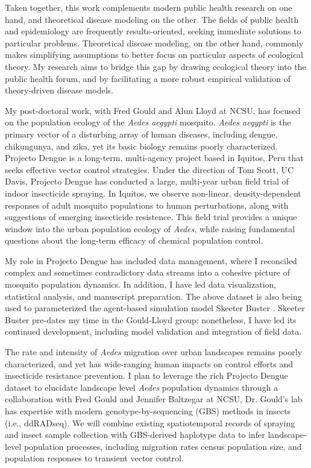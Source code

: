 \documentclass[12pt]{article}
\begin{document}
Taken together, this work complements modern public 
health research on one hand, and theoretical disease modeling on the other.
The fields of public health and epidemiology are frequently results-oriented, 
seeking immediate solutions to particular problems. 
Theoretical disease modeling, on the other hand, commonly makes simplifying 
assumptions to better focus on particular aspects of ecological theory.
My research aims to bridge this
gap by drawing ecological theory into the public health forum, and by
facilitating a more robust empirical validation of theory-driven disease 
models.

My post-doctoral work, with Fred Gould and Alun Lloyd at NCSU, has focused 
on the population ecology of the {\em Aedes aegypti} mosquito.
{\em Aedes aegypti} is the primary vector of a disturbing array of human
diseases, including dengue, chikungunya, and zika, yet its basic biology remains
poorly characterized. Projecto Dengue is a long-term, multi-agency project
based in Iquitos, Peru that seeks effective vector control strategies. 
Under the direction of Tom Scott, UC Davis, Projecto Dengue has conducted 
a large, multi-year urban field 
trial of indoor insecticide spraying.  In Iquitos, we observe non-linear, 
density-dependent responses of adult mosquito populations to human
perturbations, along with suggestions of emerging insecticide resistence.
This field trial provides a unique window into the urban population ecology of {\em
Aedes}, while raising fundamental questions about the long-term efficacy of 
chemical population control. 

My role in Projecto Dengue has included data management,
where I reconciled complex and sometimes 
contradictory data streams into a cohesive picture of mosquito
population dynamics. In addition, I have led data visualization,
statistical analysis, and manuscript preparation.
The above dataset is also being used to parameterized 
the agent-based simulation model Skeeter Buster
\citep{magori2009skeeter, okamoto2013reduce}. 
Skeeter Buster pre-dates my time in the Gould-Lloyd group; nonetheless,
I have led its continued development, including model validation and
integration of field data.

The rate and intensity of {\em Aedes} migration over urban landscapes 
remains poorly characterized, and yet has wide-ranging human impacts on
control efforts and insecticide resistance prevention.
I plan to leverage the rich Projecto Dengue dataset 
to elucidate landscape level {\em Aedes} population dynamics 
through a collaboration with Fred Gould and Jennifer Baltzegar at NCSU,
Dr. Gould's lab has expertise with modern genotype-by-sequencing (GBS) 
methods in insects (i.e., ddRADseq). We will combine existing 
spatiotemporal records of spraying and insect sample collection with 
GBS-derived haplotype data to infer landscape-level population processes, 
including migration rates census population size, and population responses 
to transient vector control.
\end{document}
